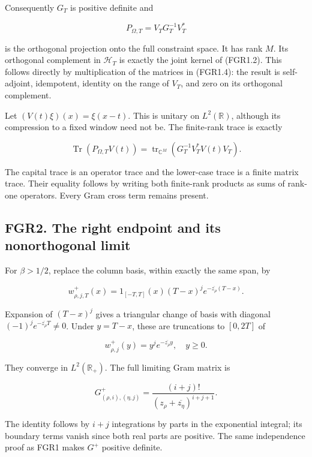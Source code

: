 Consequently \(G_T\) is positive definite and

\[
 P_{\Omega,T}=V_TG_T^{-1}V_T^*
\tag{FGR1.4}
\]

is the orthogonal projection onto the full constraint space. It has rank
\(M\). Its orthogonal complement in \(\mathscr H_T\) is exactly the
joint kernel of (FGR1.2). This follows directly by multiplication of the
matrices in (FGR1.4): the result is self-adjoint, idempotent, identity
on the range of \(V_T\), and zero on its orthogonal complement.

Let \((V(t)\xi)(x)=\xi(x-t)\). This is unitary on \(L^2(\mathbb R)\),
although its compression to a fixed window need not be. The finite-rank
trace is exactly

\[
 \operatorname{Tr}(P_{\Omega,T}V(t))
 =\operatorname{tr}_{\mathbb C^M}
 \left(G_T^{-1}V_T^*V(t)V_T\right).
\tag{FGR1.5}
\]

The capital trace is an operator trace and the lower-case trace is a
finite matrix trace. Their equality follows by writing both finite-rank
products as sums of rank-one operators. Every Gram cross term remains
present.

\subsection{FGR2. The right endpoint and its nonorthogonal
limit}\label{fgr2.-the-right-endpoint-and-its-nonorthogonal-limit}

For \(\beta>1/2\), replace the column basis, within exactly the same
span, by

\[
 w^+_{\rho,j,T}(x)=1_{[-T,T]}(x)(T-x)^j
                         e^{-\overline{z_\rho}(T-x)}.
\tag{FGR2.1}
\]

Expansion of \((T-x)^j\) gives a triangular change of basis with
diagonal \((-1)^j e^{-\overline{z_\rho}T}\ne0\). Under \(y=T-x\), these
are truncations to \([0,2T]\) of

\[
 w^+_{\rho,j}(y)=y^j e^{-\overline{z_\rho}y},\quad y\geq0.
\]

They converge in \(L^2(\mathbb R_+)\). The full limiting Gram matrix is

\[
 G^+_{(\rho,i),(\eta,j)}
 =\frac{(i+j)!}{(z_\rho+\overline{z_\eta})^{i+j+1}}.
\tag{FGR2.2}
\]

The identity follows by \(i+j\) integrations by parts in the exponential
integral; its boundary terms vanish since both real parts are positive.
The same independence proof as FGR1 makes \(G^+\) positive definite.

